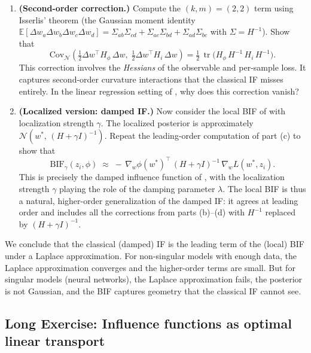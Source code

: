 \documentclass[11pt]{article}
\newcommand{\E}{\mathbb{E}}
\DeclareMathOperator{\tr}{tr}
\begin{document}
\begin{exercise}
\begin{enumerate}
  \item[(d)] \textbf{(Second-order correction.)} Compute the $(k,m) = (2,2)$ term using Isserlis' theorem (the Gaussian moment identity $\E[\Delta w_a\Delta w_b\Delta w_c\Delta w_d] = \Sigma_{ab}\Sigma_{cd} + \Sigma_{ac}\Sigma_{bd} + \Sigma_{ad}\Sigma_{bc}$ with $\Sigma = H^{-1}$). Show that
  \[
    \mathrm{Cov}_{\mathcal{N}}\!\left(\tfrac{1}{2}\Delta w^\top H_\phi\,\Delta w,\;\tfrac{1}{2}\Delta w^\top H_i\,\Delta w\right) = \tfrac{1}{2}\,\tr\bigl(H_\phi\,H^{-1}\,H_i\,H^{-1}\bigr).
  \]
  This correction involves the \emph{Hessians} of the observable and per-sample loss. It captures second-order curvature interactions that the classical IF misses entirely. In the linear regression setting of , why does this correction vanish?

  \item[(e)] \textbf{(Localized version: damped IF.)} Now consider the local BIF of  with localization strength $\gamma$. The localized posterior is approximately $\mathcal{N}(w^*,\,(H+\gamma I)^{-1})$. Repeat the leading-order computation of part (c) to show that
  \[
    \mathrm{BIF}_\gamma(z_i,\phi) \;\approx\; -\,\nabla_w\phi(w^*)^\top\,(H + \gamma I)^{-1}\,\nabla_w L(w^*,z_i).
  \]
  This is precisely the damped influence function of , with the localization strength $\gamma$ playing the role of the damping parameter $\lambda$. The local BIF is thus a natural, higher-order generalization of the damped IF: it agrees at leading order and includes all the corrections from parts (b)--(d) with $H^{-1}$ replaced by $(H + \gamma I)^{-1}$.

\end{enumerate}
\end{exercise}
\begin{remark}
    We conclude that the classical (damped) IF is the leading term of the (local) BIF under a Laplace approximation. For non-singular models with enough data, the Laplace approximation converges and the higher-order terms are small. But for singular models (neural networks), the Laplace approximation fails, the posterior is not Gaussian, and the BIF captures geometry that the classical IF cannot see.
\end{remark}
\subsection{Long Exercise: Influence functions as optimal linear transport}\label{subsec:bif-ot}
\end{document}
